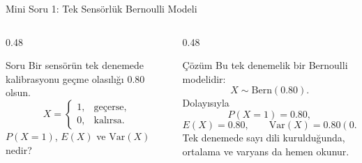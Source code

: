 \documentclass[light]{lutbeamer}
\begin{document}
\begin{frame}{Mini Soru 1: Tek Sensörlük Bernoulli Modeli}
    \scriptsize
    \begin{columns}[T,onlytextwidth]
        \begin{column}{0.48\textwidth}
            \begin{block}{Soru}
                Bir sensörün tek denemede kalibrasyonu geçme olasılığı \(0.80\) olsun.
                \[
                X=
                \begin{cases}
                1, & \text{geçerse},\\
                0, & \text{kalırsa}.
                \end{cases}
                \]
                \(P(X=1)\), \(E(X)\) ve \(\mathrm{Var}(X)\) nedir?
            \end{block}
        \end{column}
        \begin{column}{0.48\textwidth}
            \begin{exampleblock}{Çözüm}
                Bu tek denemelik bir Bernoulli modelidir:
                \[
                X\sim \mathrm{Bern}(0.80).
                \]
                Dolayısıyla
                \[
                P(X=1)=0.80,
                \]
                \[
                E(X)=0.80,\qquad \mathrm{Var}(X)=0.80(0.20)=0.16.
                \]
                Tek denemede sayı dili kurulduğunda, ortalama ve varyans da hemen okunur.
            \end{exampleblock}
        \end{column}
    \end{columns}
\end{frame}
\end{document}
